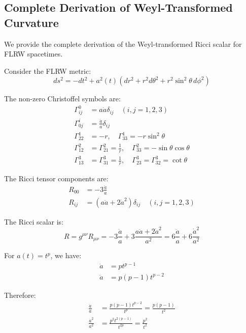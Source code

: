 \subsection{Complete Derivation of Weyl-Transformed Curvature}
\label{app:weyl_curvature_derivation}

We provide the complete derivation of the Weyl-transformed Ricci scalar for FLRW spacetimes.

Consider the FLRW metric:
\begin{equation}
ds^2 = -dt^2 + a^2(t) \left( dr^2 + r^2 d\theta^2 + r^2 \sin^2\theta \, d\phi^2 \right)
\end{equation}

The non-zero Christoffel symbols are:
\begin{align}
\Gamma^0_{ij} &= a \dot{a} \delta_{ij} \quad (i,j = 1,2,3) \\
\Gamma^i_{0j} &= \frac{\dot{a}}{a} \delta_{ij} \\
\Gamma^1_{22} &= -r, \quad \Gamma^1_{33} = -r \sin^2\theta \\
\Gamma^2_{12} &= \Gamma^2_{21} = \frac{1}{r}, \quad \Gamma^2_{33} = -\sin\theta \cos\theta \\
\Gamma^3_{13} &= \Gamma^3_{31} = \frac{1}{r}, \quad \Gamma^3_{23} = \Gamma^3_{32} = \cot\theta
\end{align}

The Ricci tensor components are:
\begin{align}
R_{00} &= -3 \frac{\ddot{a}}{a} \\
R_{ij} &= \left( a \ddot{a} + 2 \dot{a}^2 \right) \delta_{ij} \quad (i,j = 1,2,3)
\end{align}

The Ricci scalar is:
\begin{equation}
R = g^{\mu\nu} R_{\mu\nu} = -3 \frac{\ddot{a}}{a} + 3 \frac{a \ddot{a} + 2 \dot{a}^2}{a^2} = 6 \frac{\ddot{a}}{a} + 6 \frac{\dot{a}^2}{a^2}
\end{equation}

For $a(t) = t^p$, we have:
\begin{align}
\dot{a} &= p t^{p-1} \\
\ddot{a} &= p(p-1) t^{p-2}
\end{align}

Therefore:
\begin{align}
\frac{\ddot{a}}{a} &= \frac{p(p-1) t^{p-2}}{t^p} = \frac{p(p-1)}{t^2} \\
\frac{\dot{a}^2}{a^2} &= \frac{p^2 t^{2(p-1)}}{t^{2p}} = \frac{p^2}{t^2}
\end{align}

